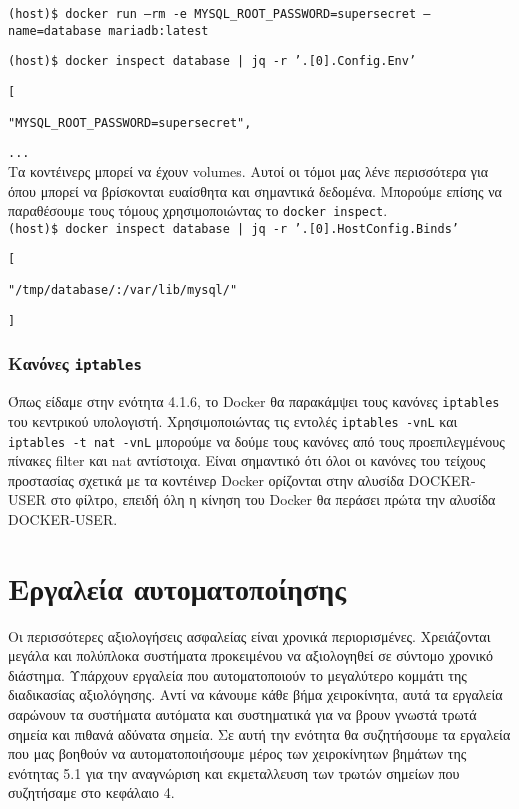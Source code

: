 \texttt{\textlatin{(host)\$ docker run --rm -e MYSQL\_ROOT\_PASSWORD=supersecret --name=database mariadb:latest}}

\texttt{\textlatin{(host)\$ docker inspect database | jq -r '.[0].Config.Env'}}

\texttt{\textlatin{[}}

\texttt{\textlatin{"MYSQL\_ROOT\_PASSWORD=supersecret",}}

\texttt{\textlatin{...}} \\

Τα κοντέινερς μπορεί να έχουν \textlatin{volumes}. Αυτοί οι τόμοι μας λένε
περισσότερα για όπου μπορεί να βρίσκονται ευαίσθητα και σημαντικά δεδομένα.
Μπορούμε επίσης να παραθέσουμε τους τόμους χρησιμοποιώντας το
\texttt{\textlatin{docker inspect}}. \\

\texttt{\textlatin{(host)\$ docker inspect database | jq -r '.[0].HostConfig.Binds'}}

\texttt{\textlatin{[}}

\texttt{\textlatin{"/tmp/database/:/var/lib/mysql/"}}

\texttt{\textlatin{]}} \\


\subsubsection{Κανόνες \texttt{\textlatin{iptables}}}

Όπως είδαμε στην ενότητα 4.1.6, το \textlatin{Docker} θα παρακάμψει τους κανόνες
\texttt{\textlatin{iptables}} του κεντρικού υπολογιστή.
Χρησιμοποιώντας τις εντολές \texttt{\textlatin{iptables -vnL}} και
\texttt{\textlatin{iptables -t nat -vnL}}  μπορούμε να δούμε τους κανόνες από
τους προεπιλεγμένους πίνακες \textlatin{filter} και  \textlatin{nat} αντίστοιχα.
Είναι σημαντικό ότι όλοι οι κανόνες του τείχους προστασίας σχετικά με τα
κοντέινερ \textlatin{Docker} ορίζονται στην αλυσίδα \textlatin{DOCKER-USER}
στο φίλτρο, επειδή όλη η κίνηση του \textlatin{Docker} θα περάσει πρώτα την
αλυσίδα \textlatin{DOCKER-USER}.

\section{Εργαλεία αυτοματοποίησης}

Οι περισσότερες αξιολογήσεις ασφαλείας είναι χρονικά περιορισμένες. Χρειάζονται
μεγάλα και πολύπλοκα συστήματα προκειμένου να αξιολογηθεί σε σύντομο χρονικό
διάστημα. Υπάρχουν εργαλεία που αυτοματοποιούν το μεγαλύτερο κομμάτι της
διαδικασίας αξιολόγησης. Αντί να κάνουμε κάθε βήμα χειροκίνητα, αυτά τα εργαλεία
σαρώνουν τα συστήματα αυτόματα και συστηματικά για να βρουν γνωστά τρωτά σημεία
και πιθανά αδύνατα σημεία. Σε αυτή την ενότητα θα συζητήσουμε τα εργαλεία
που μας βοηθούν να αυτοματοποιήσουμε μέρος των χειροκίνητων βημάτων της ενότητας
5.1 για την αναγνώριση και εκμεταλλευση των τρωτών σημείων που συζητήσαμε στο
κεφάλαιο 4.

